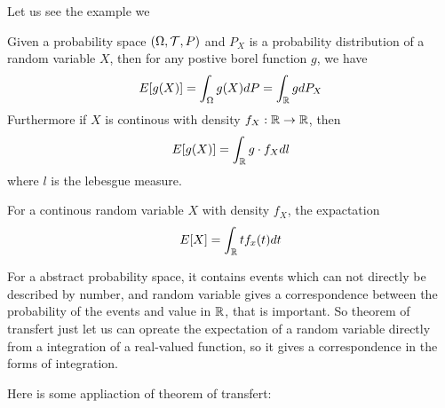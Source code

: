 \documentclass[en,geye,blue,normal,12pt,bibend=bibtex]{elegantnote}
\begin{document}
Let us see the example we 

\begin{theorem}
    Given a probability space \((\Omega, \mathcal{T}, P)\) and \(P_X\) is a probability distribution of a random variable \(X\), then for any postive borel function \(g\), we have
    \[E[g(X)] = \int_{\Omega} g(X)dP = \int_{\mathbb{R}}gdP_X\]
    Furthermore if \(X\) is continous with density \(f_X: \mathbb{R} \to \mathbb{R}\), then
    \[E[g(X)] = \int_{\mathbb{R}} g \cdot f_X dl\]
    where \(l\) is the lebesgue measure.
\end{theorem}

\begin{corollary}
    For a continous random variable \(X\) with density \(f_X\), the expactation
    \[E[X] = \int_{\mathbb{R}} tf_x(t) dt\]
\end{corollary}

\begin{remark}
    For a abstract probability space, it contains events which can not directly be described by number, and random variable gives a correspondence between the probability of the events and value in \(\mathbb{R}\), that is important. So theorem of transfert just let us can opreate the expectation of a random variable directly from a integration of a real-valued function, so it gives a correspondence in the forms of integration.
\end{remark}

Here is some appliaction of theorem of transfert:
\end{document}
